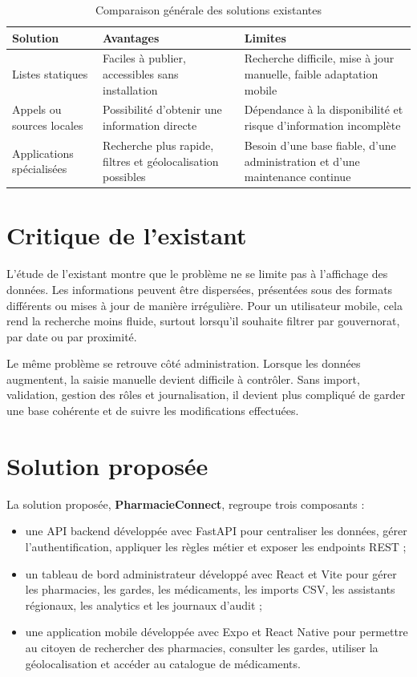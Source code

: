 \begin{table}[H]
    \centering
    \caption{Comparaison générale des solutions existantes}
    \begin{tabular}{L{4cm}L{4.5cm}L{4.5cm}}
        \toprule
        \textbf{Solution} & \textbf{Avantages} & \textbf{Limites} \\
        \midrule
        Listes statiques & Faciles à publier, accessibles sans installation & Recherche difficile, mise à jour manuelle, faible adaptation mobile \\
        Appels ou sources locales & Possibilité d'obtenir une information directe & Dépendance à la disponibilité et risque d'information incomplète \\
        Applications spécialisées & Recherche plus rapide, filtres et géolocalisation possibles & Besoin d'une base fiable, d'une administration et d'une maintenance continue \\
        \bottomrule
    \end{tabular}
\end{table}

\section{Critique de l'existant}

L'étude de l'existant montre que le problème ne se limite pas à l'affichage des données. Les informations
peuvent être dispersées, présentées sous des formats différents ou mises à jour de manière irrégulière.
Pour un utilisateur mobile, cela rend la recherche moins fluide, surtout lorsqu'il souhaite filtrer par
gouvernorat, par date ou par proximité.

Le même problème se retrouve côté administration. Lorsque les données augmentent, la saisie manuelle
devient difficile à contrôler. Sans import, validation, gestion des rôles et journalisation, il devient plus
compliqué de garder une base cohérente et de suivre les modifications effectuées.

\section{Solution proposée}

La solution proposée, \textbf{PharmacieConnect}, regroupe trois composants :

\begin{itemize}
    \item une API backend développée avec FastAPI pour centraliser les données, gérer l'authentification,
    appliquer les règles métier et exposer les endpoints REST ;
    \item un tableau de bord administrateur développé avec React et Vite pour gérer les pharmacies, les
    gardes, les médicaments, les imports CSV, les assistants régionaux, les analytics et les journaux d'audit ;
    \item une application mobile développée avec Expo et React Native pour permettre au citoyen de
    rechercher des pharmacies, consulter les gardes, utiliser la géolocalisation et accéder au catalogue
    de médicaments.
\end{itemize}

